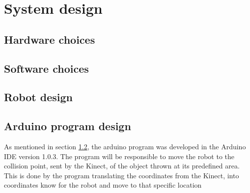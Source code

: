 \chapter{System design}
\label{chap:System design}

\section{Hardware choices}
\label{sec:Hardware choices}

\section{Software choices}
\label{sec:Software choices}

\section{Robot design}
\label{sec:Robot design}

\section{Arduino program design}
\label{sec:Arduino program design}
As mentioned in section \ref{sec:Software choices}, the arduino program was developed in the Arduino IDE version 1.0.3. The program will be responsible to move the robot to the collision point, sent by the Kinect, of the object thrown at its predefined area. This is done by the program translating the coordinates from the Kinect, into coordinates know for the robot and move to that specific location


